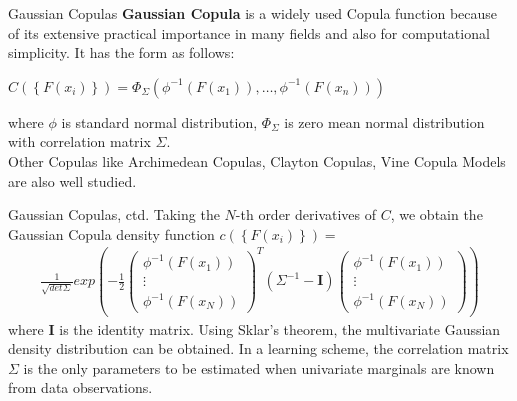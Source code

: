 \begin{frame}{Gaussian Copulas}
\textbf{Gaussian Copula} is a widely used Copula function because of its extensive practical importance in many fields and also for computational simplicity. It has the form as follows: 
\begin{center}
$C\left(\left\lbrace F\left(x_i\right)\right\rbrace\right) = \Phi_\Sigma\left(\phi^{-1}\left(F\left(x_1\right)\right),\ldots,\phi^{-1}\left(F\left(x_n\right)\right)\right)$
\end{center}
where $\phi$ is standard normal distribution, $\Phi_\Sigma$ is zero mean normal distribution with correlation matrix $\Sigma$. \\
Other Copulas like Archimedean Copulas, Clayton Copulas, Vine Copula Models are also well studied.
\end{frame}
\begin{frame}{Gaussian Copulas, ctd.}
Taking the $N$-th order derivatives of $C$, we obtain the Gaussian Copula density function $c\left(\left\lbrace F\left(x_i\right)\right\rbrace\right)= $
\begin{align*}
\frac{1}{\sqrt{det\Sigma}}exp\left(-\frac{1}{2} \begin{pmatrix}
\phi^{-1}\left(F\left(x_1\right)\right)\\
\vdots\\
\phi^{-1}\left(F\left(x_N\right)\right)
\end{pmatrix}^T \left(\Sigma^{-1}-\mathbf{I}\right)\begin{pmatrix}
\phi^{-1}\left(F\left(x_1\right)\right)\\
\vdots\\
\phi^{-1}\left(F\left(x_N\right)\right)
\end{pmatrix}\right)
\end{align*}
where $\mathbf{I}$ is the identity matrix. Using Sklar's theorem, the multivariate Gaussian density distribution can be obtained. In a learning scheme, the correlation matrix $\Sigma$ is the only parameters to be estimated when univariate marginals are known from data observations. 
\end{frame}
